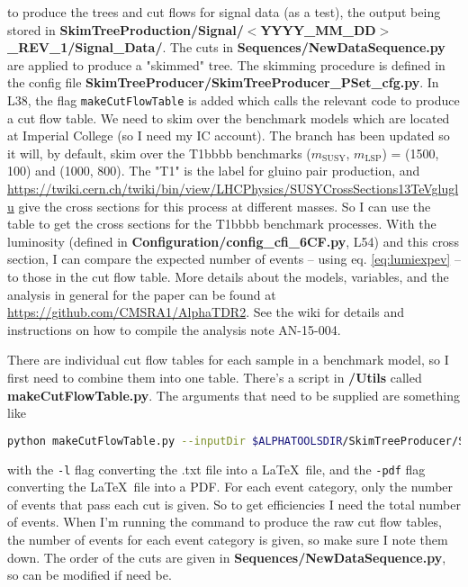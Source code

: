 to produce the trees and cut flows for signal data (as a test), the output being stored in \textbf{SkimTreeProduction/Signal/$<$YYYY\_MM\_DD$>$\_REV\_1/Signal\_Data/}. The cuts in \textbf{Sequences/NewDataSequence.py} are applied to produce a "skimmed" tree. The skimming procedure is defined in the config file \textbf{SkimTreeProducer/SkimTreeProducer\_PSet\_cfg.py}. In L38, the flag \texttt{makeCutFlowTable} is added which calls the relevant code to produce a cut flow table. We need to skim over the benchmark models which are located at Imperial College (so I need my IC account). The branch has been updated so it will, by default, skim over the T1bbbb benchmarks ($m_{\mathrm{SUSY}}$, $m_{\mathrm{LSP}}$) = (1500, 100) and (1000, 800). The "T1" is the label for gluino pair production, and \url{https://twiki.cern.ch/twiki/bin/view/LHCPhysics/SUSYCrossSections13TeVgluglu} give the cross sections for this process at different masses. So I can use the table to get the cross sections for the T1bbbb benchmark processes. With the luminosity (defined in \textbf{Configuration/config\_cfi\_6CF.py}, L54) and this cross section, I can compare the expected number of events -- using eq. \ref{eq:lumiexpev} -- to those in the cut flow table. More details about the models, variables, and the analysis in general for the paper can be found at \url{https://github.com/CMSRA1/AlphaTDR2}. See the wiki for details and instructions on how to compile the analysis note AN-15-004.

There are individual cut flow tables for each sample in a benchmark model, so I first need to combine them into one table. There's a script in \textbf{/Utils} called \textbf{makeCutFlowTable.py}. The arguments that need to be supplied are something like

\begin{lstlisting}[belowskip=-0.7cm, language=sh, numbers=none]
python makeCutFlowTable.py --inputDir $ALPHATOOLSDIR/SkimTreeProducer/SkimTreeProduction/Signal/2017_01_25_REV_1/Signal_Data/ --process Signal_Run2015D_25ns -l -pdf
\end{lstlisting}

with the \texttt{-l} flag converting the .txt file into a \LaTeX\ file, and the \texttt{-pdf} flag converting the \LaTeX\ file into a PDF. For each event category, only the number of events that pass each cut is given. So to get efficiencies I need the total number of events. When I'm running the command to produce the raw cut flow tables, the number of events for each event category is given, so make sure I note them down. The order of the cuts are given in \textbf{Sequences/NewDataSequence.py}, so can be modified if need be.

